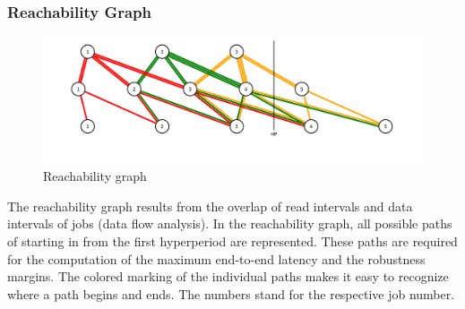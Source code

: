 \newpage
\subsubsection{Reachability Graph}
%
\begin{figure}[H]
		\centering
		\includegraphics[width=400pt]{fig/tree.pdf}
		\caption{Reachability graph}
		\label{fig:reachability}
\end{figure}
%
The reachability graph results from the overlap of read intervals and data intervals of jobs (data flow analysis). 
In the reachability graph, all possible paths of starting in from the first hyperperiod are represented.
These paths are required for the computation of the maximum end-to-end latency and the robustness margins. 
The colored marking of the individual paths makes it easy to recognize where a path begins and ends. The numbers stand for the respective job number. 
    

\newpage
